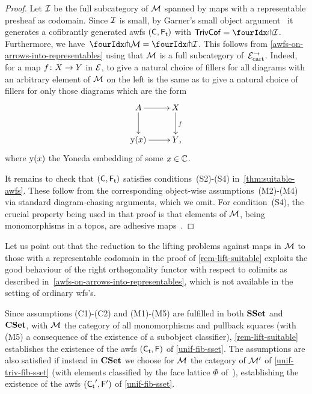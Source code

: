 \documentclass[reqno,10pt,a4paper,oneside,draft]{amsart}
\begin{document}
{{\begin{proof}
Let $\cal{I}$ be the full subcategory of $\cal{M}$ spanned by maps with a representable presheaf as codomain.
Since $\cal{I}$ is small, by Garner's small object argument~\cite{garner:small-object-argument} it generates a cofibrantly generated awfs $(\CC, \TF)$ with $\TrivCof =  \liftr{\cal{I}}$.
Furthermore, we have~$\liftr{\cal{M}} = \liftr{\cal{I}}$.
This follows from \cref{awfs-on-arrows-into-representables} using that $\cal{M}$ is a full subcategory of~$\cal{E}^\to_\cart$.
Indeed, for a map $f \co X \to Y$ in $\catE$, to give a natural choice of fillers for all diagrams with an arbitrary element of $\cal{M}$ on the left is the same as to give a natural choice of fillers for only those diagrams which are the form
\[
\xymatrix{
  A
  \ar[r]
  \ar[d]
&
  X
  \ar[d]^f
\\
  \yon(x)
  \ar[r]
&
  Y
\rlap{,}}
\]
where $\yon(x)$ the Yoneda embedding of some $x \in \catC$.

It remains to check that $(\CC, \TF)$ satisfies conditions~(S2)-(S4) in~\cref{thm:suitable-awfs}.
These follow from the corresponding object-wise assumptions~(M2)-(M4) via standard diagram-chasing arguments, which we omit.
For condition~(S4), the crucial property being used in that proof is that elements of $\cal{M}$, being monomorphisms in a topos, are adhesive maps~\cite{garner-lack:adhesive}.
\end{proof}

\begin{remark}
\label{rem:colimit-decomp}
Let us point out that the reduction to the lifting problems against maps in $\cal{M}$ to those with a representable codomain in the proof of \cref{rem-lift-suitable} exploits the good behaviour of the right orthogonality functor with respect to colimits as described in~\cref{awfs-on-arrows-into-representables}, which is not available in the setting of ordinary wfs's.
\end{remark}

\begin{example} \label{justify-sset-cset-examples}
Since assumptions (C1)-(C2) and (M1)-(M5) are fulfilled in both $\SSet$ and~$\CSet$, with $\cal{M}$ the category of all monomorphisms and pullback squares (with (M5) a consequence of the existence of a subobject classifier), \cref{rem-lift-suitable} establishes the existence of the awfs $(\TC, \FF)$ of \cref{unif-fib-sset}.
The assumptions are also satisfied if instead in $\CSet$ we choose for $\cal{M}$ the category of $\cal{M}'$ of \cref{unif-triv-fib-sset} (with elements classified by the face lattice $\Phi$ of~\cite{cohen-et-al:cubicaltt}), establishing the existence of the awfs $(\TC', \FF')$ of \cref{unif-fib-sset}.
\end{example}

}}
\end{document}
